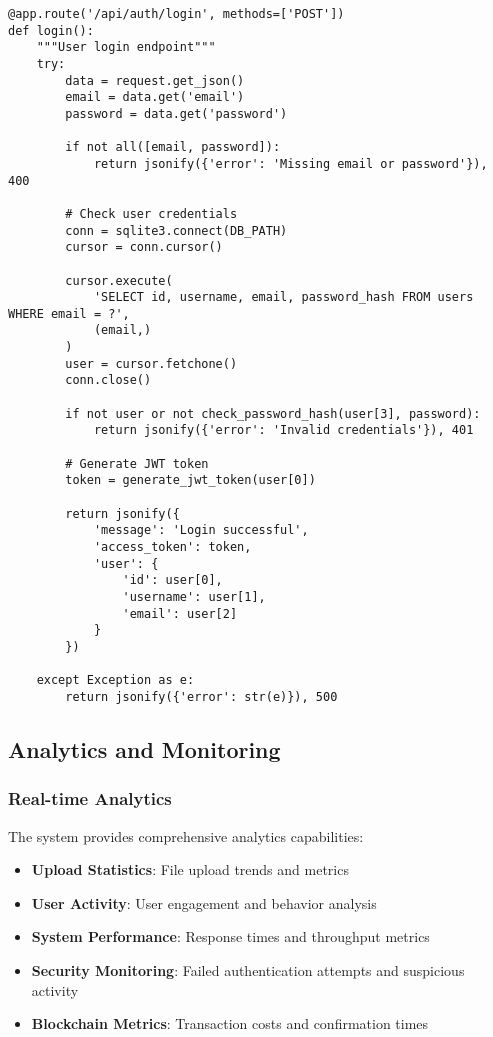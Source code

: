 \documentclass[11pt,a4paper]{article}
\begin{document}
\begin{lstlisting}[style=python, caption=Backend Authentication Implementation]
@app.route('/api/auth/login', methods=['POST'])
def login():
    """User login endpoint"""
    try:
        data = request.get_json()
        email = data.get('email')
        password = data.get('password')
        
        if not all([email, password]):
            return jsonify({'error': 'Missing email or password'}), 400
        
        # Check user credentials
        conn = sqlite3.connect(DB_PATH)
        cursor = conn.cursor()
        
        cursor.execute(
            'SELECT id, username, email, password_hash FROM users WHERE email = ?', 
            (email,)
        )
        user = cursor.fetchone()
        conn.close()
        
        if not user or not check_password_hash(user[3], password):
            return jsonify({'error': 'Invalid credentials'}), 401
        
        # Generate JWT token
        token = generate_jwt_token(user[0])
        
        return jsonify({
            'message': 'Login successful',
            'access_token': token,
            'user': {
                'id': user[0],
                'username': user[1],
                'email': user[2]
            }
        })
        
    except Exception as e:
        return jsonify({'error': str(e)}), 500
\end{lstlisting}

\subsection{Analytics and Monitoring}

\subsubsection{Real-time Analytics}
The system provides comprehensive analytics capabilities:

\begin{itemize}
    \item \textbf{Upload Statistics}: File upload trends and metrics
    \item \textbf{User Activity}: User engagement and behavior analysis
    \item \textbf{System Performance}: Response times and throughput metrics
    \item \textbf{Security Monitoring}: Failed authentication attempts and suspicious activity
    \item \textbf{Blockchain Metrics}: Transaction costs and confirmation times
\end{itemize}
\end{document}
